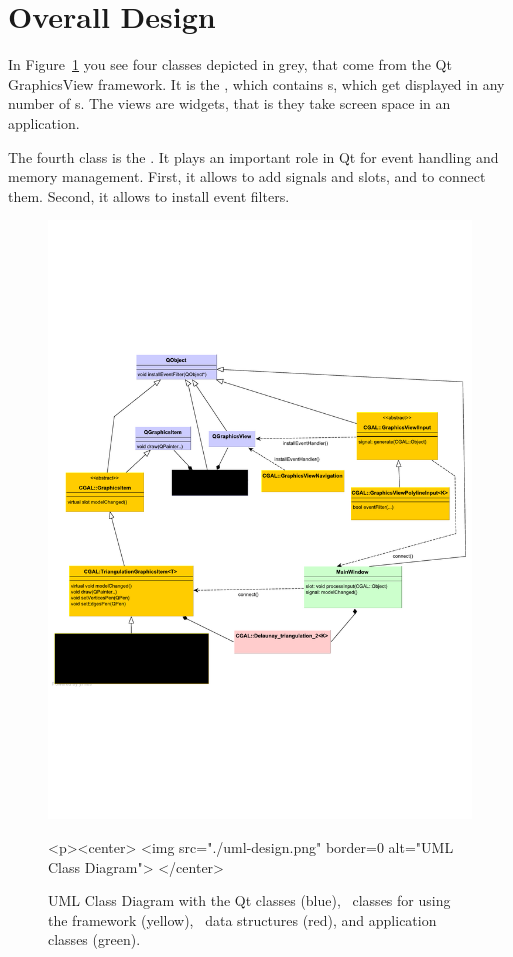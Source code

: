 \section{Overall Design}

In Figure~\ref{graphicsview:uml} you see four classes depicted in grey,
that come from the Qt GraphicsView framework. It is the ,
which contains s, which get displayed in any number
of s. The views are widgets, that is they take screen space
in an application.

The fourth class is the . It plays an important role in Qt for
event handling and memory management. First, it allows to add signals and
slots, and to connect them.  Second, it allows to install event filters.


\begin{figure}[t]
\begin{ccTexOnly}
  \begin{center}
  \includegraphics[width=\linewidth]{GraphicsView/uml-design}
  \end{center}
\end{ccTexOnly}
\begin{ccHtmlOnly}
  <p><center>
  <img src="./uml-design.png" border=0 alt="UML Class Diagram">
  </center>
\end{ccHtmlOnly}
\caption{UML Class Diagram with the Qt classes (blue), \cgal\ classes for using the framework (yellow),
\cgal\ data structures (red), and application classes (green). \label{graphicsview:uml}}
\end{figure}

